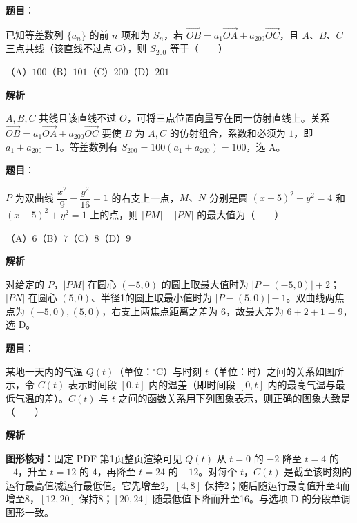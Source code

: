 \begin{answer}

\textbf{题目}：

已知等差数列 $\{a_n\}$ 的前 $n$ 项和为 $S_n$，若 $\overrightarrow{OB}=a_1\overrightarrow{OA}+a_{200}\overrightarrow{OC}$，且 $A\text{、}B\text{、}C$ 三点共线（该直线不过点 $O$），则 $S_{200}$ 等于\mbox{（　　）}

（A）$100$\quad（B）$101$\quad（C）$200$\quad（D）$201$

\textbf{解析}

$A,B,C$ 共线且该直线不过 $O$，可将三点位置向量写在同一仿射直线上。关系 $\overrightarrow{OB}=a_1\overrightarrow{OA}+a_{200}\overrightarrow{OC}$ 要使 $B$ 为 $A,C$ 的仿射组合，系数和必须为 $1$，即 $a_1+a_{200}=1$。等差数列有 $S_{200}=100(a_1+a_{200})=100$，选 A。


\end{answer}
\begin{answer}

\textbf{题目}：

$P$ 为双曲线 $\dfrac{x^2}{9}-\dfrac{y^2}{16}=1$ 的右支上一点，$M\text{、}N$ 分别是圆 $(x+5)^2+y^2=4$ 和 $(x-5)^2+y^2=1$ 上的点，则 $|PM|-|PN|$ 的最大值为\mbox{（　　）}

（A）$6$\quad（B）$7$\quad（C）$8$\quad（D）$9$

\textbf{解析}

对给定的 $P$，$|PM|$ 在圆心 $(-5,0)$ 的圆上取最大值时为 $|P-(-5,0)|+2$；$|PN|$ 在圆心 $(5,0)$、半径1的圆上取最小值时为 $|P-(5,0)|-1$。双曲线两焦点为 $(-5,0),(5,0)$，右支上两焦点距离之差为 $6$，故最大差为 $6+2+1=9$，选 D。


\end{answer}
\begin{answer}

\textbf{题目}：

某地一天内的气温 $Q(t)$（单位：$^\circ\mathrm C$）与时刻 $t$（单位：时）之间的关系如图所示，令 $C(t)$ 表示时间段 $[0,t]$ 内的温差（即时间段 $[0,t]$ 内的最高气温与最低气温的差）。$C(t)$ 与 $t$ 之间的函数关系用下列图象表示，则正确的图象大致是\mbox{（　　）}
\nopagebreak[4]
\begin{center}\end{center}
\nopagebreak[4]
\textbf{解析}

\textbf{图形核对}：固定 PDF 第1页整页渲染可见 $Q(t)$ 从 $t=0$ 的 $-2$ 降至 $t=4$ 的 $-4$，升至 $t=12$ 的 $4$，再降至 $t=24$ 的 $-12$。对每个 $t$，$C(t)$ 是截至该时刻的运行最高值减运行最低值。它先增至2，$[4,8]$ 保持2；随后随运行最高值升至4而增至8，$[12,20]$ 保持8；$[20,24]$ 随最低值下降而升至16。与选项 D 的分段单调图形一致。


\end{answer}
